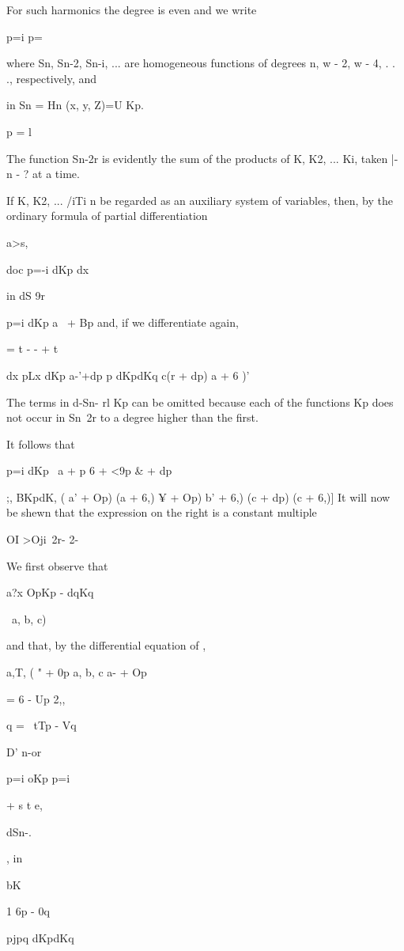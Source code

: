 {%
%

For such harmonics the degree is even and we write

p=i p=\

where Sn, Sn-2, Sn-i, ... are homogeneous functions of degrees n, w
- 2, w - 4, . . ., respectively, and

in Sn = Hn (x, y, Z)=U Kp.

p = l

The function Sn-2r is evidently the sum of the products of K, K2, ...
Ki, taken |- n - ? at a time.

If K, K2, ... /iTi n be regarded as an auxiliary system of variables,
then, by the ordinary formula of partial differentiation

a>s,

doc p=-i dKp dx

in dS 9r

p=i dKp a~ + Bp and, if we differentiate again,

= t - - + t

dx pLx dKp a-'+dp p dKpdKq c(r + dp) a + 6 )'

The terms in d-Sn- rl Kp can be omitted because each of the functions
Kp does not occur in Sn\ 2r to a degree higher than the first.

It follows that

p=i dKp \ a + p 6 + <9p \& + dp\

;, BKpdK, ( a' + Op) (a + 6,) ¥ + Op) b' + 6,) (c + dp) (c + 6,)] It
will now be shewn that the expression on the right is a constant
multiple

OI >Oji\ 2r- 2-

We first observe that

a?x OpKp - dqKq

\ a, b, c)

and that, by the differential equation of ,

a,T, ( " + 0p a, b, c a- + Op

= 6 - Up 2,,

q = \ tTp - Vq

%
%

D' n-or

p=i oKp p=i

+ s t e,

dSn-.

, in

bK

1 6p - 0q

pjpq dKpdKq

}
